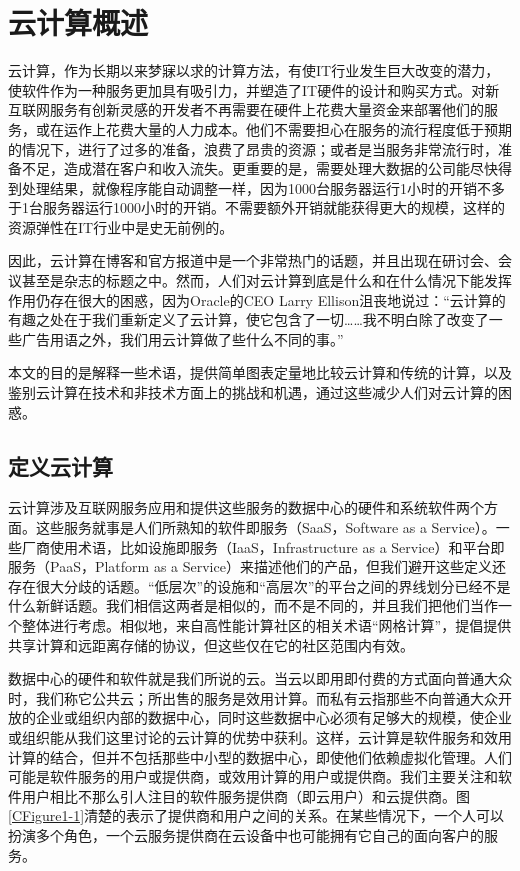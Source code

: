 \chapter{云计算概述}

云计算，作为长期以来梦寐以求的计算方法，有使IT行业发生巨大改变的潜力，使软件作为一种服务更加具有吸引力，并塑造了IT硬件的设计和购买方式。对新互联网服务有创新灵感的开发者不再需要在硬件上花费大量资金来部署他们的服务，或在运作上花费大量的人力成本。他们不需要担心在服务的流行程度低于预期的情况下，进行了过多的准备，浪费了昂贵的资源；或者是当服务非常流行时，准备不足，造成潜在客户和收入流失。更重要的是，需要处理大数据的公司能尽快得到处理结果，就像程序能自动调整一样，因为1000台服务器运行1小时的开销不多于1台服务器运行1000小时的开销。不需要额外开销就能获得更大的规模，这样的资源弹性在IT行业中是史无前例的。

因此，云计算在博客和官方报道中是一个非常热门的话题，并且出现在研讨会、会议甚至是杂志的标题之中。然而，人们对云计算到底是什么和在什么情况下能发挥作用仍存在很大的困惑，因为Oracle的CEO Larry Ellison沮丧地说过：“云计算的有趣之处在于我们重新定义了云计算，使它包含了一切……我不明白除了改变了一些广告用语之外，我们用云计算做了些什么不同的事。”

本文的目的是解释一些术语，提供简单图表定量地比较云计算和传统的计算，以及鉴别云计算在技术和非技术方面上的挑战和机遇，通过这些减少人们对云计算的困惑。

\section{定义云计算}

云计算涉及互联网服务应用和提供这些服务的数据中心的硬件和系统软件两个方面。这些服务就事是人们所熟知的软件即服务（SaaS，Software as a Service）。一些厂商使用术语，比如设施即服务（IaaS，Infrastructure as a Service）和平台即服务（PaaS，Platform as a Service）来描述他们的产品，但我们避开这些定义还存在很大分歧的话题。“低层次”的设施和“高层次”的平台之间的界线划分已经不是什么新鲜话题。我们相信这两者是相似的，而不是不同的，并且我们把他们当作一个整体进行考虑。相似地，来自高性能计算社区的相关术语“网格计算”，提倡提供共享计算和远距离存储的协议，但这些仅在它的社区范围内有效。

数据中心的硬件和软件就是我们所说的云。当云以即用即付费的方式面向普通大众时，我们称它公共云；所出售的服务是效用计算。而私有云指那些不向普通大众开放的企业或组织内部的数据中心，同时这些数据中心必须有足够大的规模，使企业或组织能从我们这里讨论的云计算的优势中获利。这样，云计算是软件服务和效用计算的结合，但并不包括那些中小型的数据中心，即使他们依赖虚拟化管理。人们可能是软件服务的用户或提供商，或效用计算的用户或提供商。我们主要关注和软件用户相比不那么引人注目的软件服务提供商（即云用户）和云提供商。图\ref{CFigure1-1}清楚的表示了提供商和用户之间的关系。在某些情况下，一个人可以扮演多个角色，一个云服务提供商在云设备中也可能拥有它自己的面向客户的服务。

